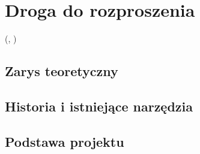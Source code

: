 \chapter{Droga do rozproszenia}
\label{cha:rozproszenie}

(\cite{Dil00}, \cite{Lam92})

\section{Zarys teoretyczny}
\label{sec:teoriaRozproszenia}

\section{Historia i istniejące narzędzia}
\label{sec:narzedzia}

\section{Podstawa projektu}
\label{sec:podstawaProjektu}
